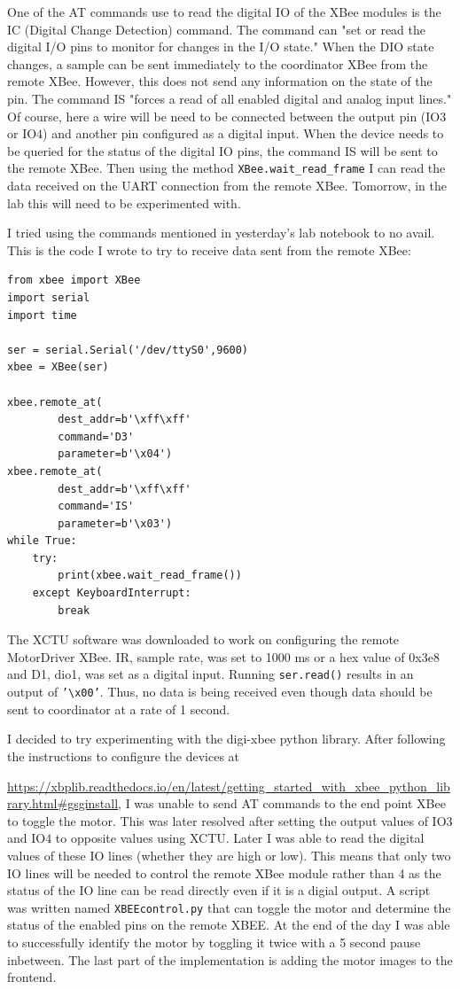 \documentclass[fontsize=11pt, %
                             paper=letter, %
                             twoside, %
                             captions=tableheading,
                             index=totoc,
                             hyperref]{labbook}
\begin{document}
\begin{addmargin}[0cm]{0cm}
One of the AT commands use to read the digital IO of the XBee modules is the IC (Digital Change Detection) command. The command can "set or read the digital I/O pins to monitor  for changes in the I/O state." When the DIO state changes, a sample can be sent immediately to the coordinator XBee from the remote XBee. However, this does not send any information on the state of the pin. The command IS "forces a read of all enabled digital and analog input lines." Of course, here a wire will be need to be connected between the output pin (IO$3$ or IO$4$) and another pin configured as a digital input. When the device needs to be queried for the status of the digital IO pins, the command IS will be sent to the remote XBee. Then using the method \texttt{XBee.wait\_read\_frame} I can read the data received on the UART connection from the remote XBee. Tomorrow, in the lab this will need to be experimented with.

I tried using the commands mentioned in yesterday's lab notebook to no avail. This is the code I wrote to try to receive data sent from the remote XBee:
\begin{Verbatim}[tabsize=4]
from xbee import XBee
import serial
import time

ser = serial.Serial('/dev/ttyS0',9600)
xbee = XBee(ser)

xbee.remote_at(
		dest_addr=b'\xff\xff'
		command='D3'
		parameter=b'\x04')
xbee.remote_at(
		dest_addr=b'\xff\xff'
		command='IS'
		parameter=b'\x03')
while True:
	try:
		print(xbee.wait_read_frame())
	except KeyboardInterrupt:
		break
\end{Verbatim}
The XCTU software was downloaded to work on configuring the remote MotorDriver XBee. IR, sample rate, was set to 1000 ms or a hex value of 0x3e8 and D1, dio1, was set as a digital input. Running \texttt{ser.read()} results in an output of \texttt{'\textbackslash x00'}. Thus, no data is being received even though data should be sent to coordinator at a rate of 1 second.

I decided to try experimenting with the digi-xbee python library. After following the instructions to configure the devices at 

\url{https://xbplib.readthedocs.io/en/latest/getting_started_with_xbee_python_library.html#gsginstall},
I was unable to send AT commands to the end point XBee to toggle the motor. This was later resolved after setting the output values of IO$3$ and IO$4$ to opposite values using XCTU. Later I was able to read the digital values of these IO lines (whether they are high or low). This means that only two IO lines will be needed to control the remote XBee module rather than 4 as the status of the IO line can be read directly even if it is a digial output. A script was written named \texttt{XBEEcontrol.py} that can toggle the motor and determine the status of the enabled pins on the remote XBEE. At the end of the day I was able to successfully identify the motor by toggling it twice with a 5 second pause inbetween. The last part of the implementation is adding the motor images to the frontend.


\end{addmargin}
\end{document}
